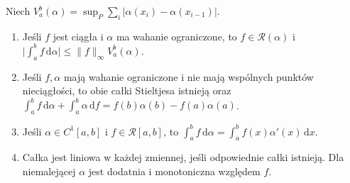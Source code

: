 \begin{twierdzenie}[Narzędzia]\label{it:thm:rs-tools}
Niech $V_a^b(\alpha)=\sup_P\sum_i|\alpha(x_i)-\alpha(x_{i-1})|$.
\begin{enumerate}[label=(\alph*)]
\item Jeśli $f$ jest ciągła i $\alpha$ ma wahanie ograniczone, to $f\in\mathcal R(\alpha)$ i $\bigl|\int_a^b f\,\mathrm d\alpha\bigr|\le\|f\|_\infty V_a^b(\alpha)$.
\item Jeśli $f,\alpha$ mają wahanie ograniczone i nie mają wspólnych punktów nieciągłości, to obie całki Stieltjesa istnieją oraz
$\int_a^b f\,\mathrm d\alpha+\int_a^b\alpha\,\mathrm df=f(b)\alpha(b)-f(a)\alpha(a)$.
\item Jeśli $\alpha\in C^1[a,b]$ i $f\in\mathcal R[a,b]$, to $\int_a^b f\,\mathrm d\alpha=\int_a^b f(x)\alpha'(x)\,\mathrm dx$.
\item Całka jest liniowa w każdej zmiennej, jeśli odpowiednie całki istnieją. Dla niemalejącej $\alpha$ jest dodatnia i monotoniczna względem $f$.
\end{enumerate}
\end{twierdzenie}
